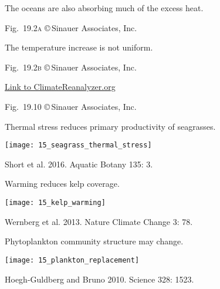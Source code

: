 \documentclass[t]{beamer}
\begin{document}
{
\begin{frame}[b]{The oceans are also absorbing much of the excess heat.}

	\hfill \tiny Fig.~19.2\textsc{a} \copyright\,Sinauer Associates, Inc.

\end{frame}
}
%
{
\begin{frame}[b]{The temperature increase is not uniform.}

	\hfill \tiny Fig.~19.2\textsc{b} \copyright\,Sinauer Associates, Inc.

\end{frame}
}
%
{
\begin{frame}[b]

	\hfill \tiny \href{http://cci-reanalyzer.org/DailySummary/\#SST_anom}{Link to ClimateReanalyzer.org}

\end{frame}
}
%
{
\begin{frame}[b]

	\hfill \tiny Fig.~19.10 \copyright\,Sinauer Associates, Inc.

\end{frame}
}
%
\begin{frame}[t]{Thermal stress reduces primary productivity of seagrasses.}
	
	\texttt{[image: 15\_seagrass\_thermal\_stress]}\par
	
	\vfilll
	
	\hfill \tiny Short et al. 2016. Aquatic Botany 135: 3.

\end{frame}
%
\begin{frame}[t]{Warming reduces kelp coverage.}

	\texttt{[image: 15\_kelp\_warming]}
	
	\vfilll
	
	\hfill \tiny Wernberg et al. 2013. Nature Climate Change 3: 78.
	
\end{frame}
%
\begin{frame}[t]{Phytoplankton community structure may change.}

	\texttt{[image: 15\_plankton\_replacement]}
	
	\vfilll
	
	\hfill \tiny Hoegh-Guldberg and Bruno 2010. Science 328: 1523.
	
\end{frame}
\end{document}
